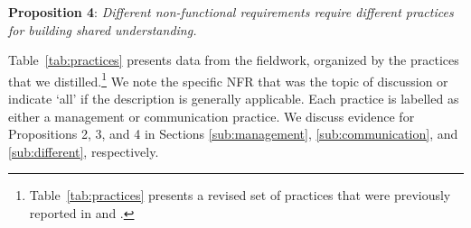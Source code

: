 \documentclass[smallextended]{svjour3}        %
\newcommand\cwproposition[2]{
\normalsize 
\vspace{0.5em}%
\noindent \textbf{\sffamily\fontsize{9}{11}\selectfont Proposition #1}: \textit{#2} %
\vspace{0.5em} %
}
\begin{document}
\cwproposition{4}{Different non-functional requirements require different practices for building shared understanding.}


\noindent Table~\ref{tab:practices} presents data from the fieldwork, organized by the practices that we distilled.\footnote{Table~\ref{tab:practices} presents a revised set of practices that were previously reported in \cite{werner2020re,werner_tse_2021} and \cite{okpara_re2022,okpara_rej2023}.} We note the specific NFR that was the topic of discussion or indicate `all' if the description is generally applicable. Each practice is labelled as either a management or communication practice.
We discuss evidence for Propositions 2, 3, and 4 in Sections \ref{sub:management}, \ref{sub:communication}, and \ref{sub:different}, respectively.
\end{document}
